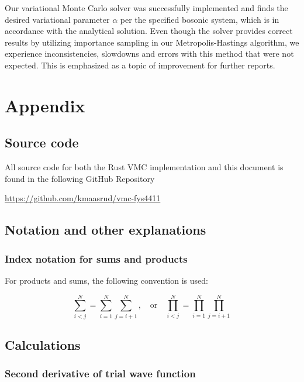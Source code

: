 \documentclass[
]{article}
\begin{document}
Our variational Monte Carlo solver was successfully implemented and
finds the desired variational parameter \(\alpha\) per the specified
bosonic system, which is in accordance with the analytical solution.
Even though the solver provides correct results by utilizing importance
sampling in our Metropolis-Hastings algorithm, we experience
inconsistencies, slowdowns and errors with this method that were not
expected. This is emphasized as a topic of improvement for further
reports.

\clearpage
\appendix

\hypertarget{appendix}{%
\section{Appendix}\label{appendix}}

\hypertarget{source-code}{%
\subsection{Source code}\label{source-code}}

All source code for both the Rust VMC implementation and this document
is found in the following GitHub Repository

\url{https://github.com/kmaasrud/vmc-fys4411}

\hypertarget{notation-and-other-explanations}{%
\subsection{Notation and other
explanations}\label{notation-and-other-explanations}}

\hypertarget{index-notation-for-sums-and-products}{%
\subsubsection{Index notation for sums and
products}\label{index-notation-for-sums-and-products}}

For products and sums, the following convention is used:

\[\sum_{i <j}^N = \sum_{i=1}^N \sum_{j=i+1}^N,\quad \text{or}\quad \prod_{i <j}^N = \prod_{i=1}^N \prod_{j=i+1}^N\]

\hypertarget{calculations}{%
\subsection{Calculations}\label{calculations}}

\hypertarget{second-derivative-of-trial-wave-function}{%
\subsubsection{Second derivative of trial wave
function}\label{second-derivative-of-trial-wave-function}}
\end{document}
